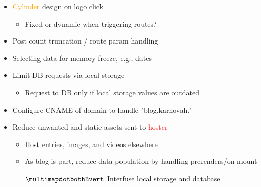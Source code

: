 \documentclass[7px]{article}
\begin{document}
{
  \raggedright
  \begin{itemize}[label=\blitzb]
    \small
    \item \textcolor{orange}{Cylinder} design on logo click\:
      \begin{itemize}[label=$\multimapinv$]
        \item Fixed or dynamic when triggering routes?
      \end{itemize}
      \normalsize
    \item Post count truncation / route param handling
    \item Selecting data for memory freeze, e.g., dates
    \item Limit DB requests via local storage
      \small
      \begin{itemize}[label=$\multimapinv$]
        \item Request to DB only if local storage values are outdated
      \end{itemize}
      \normalsize
    \item Configure CNAME of domain to handle "blog.karnovah.\textasteriskcentered"
    \item Reduce unwanted and static assets sent to \textcolor{red}{hoster}
      \small
      \begin{itemize}[label=$\multimapinv$]
        \item Host entries, images, and videos elsewhere
        \item As blog is part, reduce data population by handling prerenders/on-mount
        \item[$\multimapdotbothBvert$] Interfuse local storage and database 
      \end{itemize}
      \normalsize
  \end{itemize}
}

\deploy
{

}
{

}

\report
{

}
\end{document}
